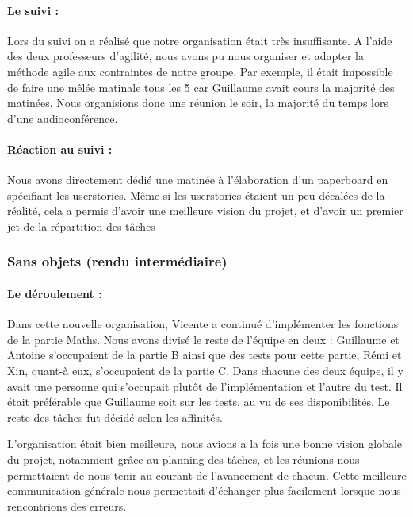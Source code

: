 \documentclass[a4paper, 12pt]{article}
\begin{document}
\paragraph*{Le suivi :}
Lors du suivi on a réalisé que notre organisation était très insuffisante.
A l'aide des deux professeurs d'agilité, nous avons pu nous organiser
et adapter la méthode agile aux contraintes de notre groupe.
Par exemple, il était impossible de faire une mêlée matinale tous les 5
car Guillaume avait cours la majorité des matinées. Nous organisions
donc une réunion le soir, la majorité du temps lors d'une audioconférence.

\paragraph*{Réaction au suivi :}

Nous avons directement dédié une matinée à l'élaboration d'un paperboard
en spécifiant les userstories. Même si les userstories étaient un peu
décalées de la réalité, cela a permis d'avoir une meilleure vision
du projet, et d'avoir un premier jet de la répartition des tâches


\subsubsection{Sans objets (rendu intermédiaire)}


\paragraph*{Le déroulement :}
Dans cette nouvelle organisation, Vicente a continué d'implémenter
les fonctions de la partie Maths. Nous avons divisé le reste de l'équipe
en deux : Guillaume et Antoine s'occupaient de la partie B ainsi que des tests
pour cette partie, Rémi et Xin, quant-à eux, s'occupaient de la partie C.
Dans chacune des deux équipe, il y avait une personne qui s'occupait plutôt
de l'implémentation et l'autre du test. Il était préférable que Guillaume
soit sur les tests, au vu de ses disponibilités. Le reste des tâches
fut décidé selon les affinités.

L'organisation était bien meilleure, nous avions a la fois une bonne vision
globale du projet, notamment grâce au planning des tâches, et les réunions
nous permettaient de nous tenir au courant de l'avancement de chacun.
Cette meilleure communication générale nous permettait d'échanger plus
facilement lorsque nous rencontrions des erreurs.
\end{document}
